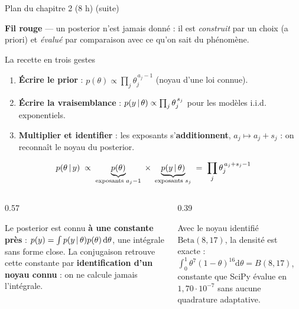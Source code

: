 \begin{frame}{Plan du chapitre 2 (8 h) (suite)}
\begin{tcolorbox}[colback=byPurple!6,colframe=byPurple,arc=2mm,width=.95\textwidth]
\small\centering
\textbf{Fil rouge} — un posterior n'est jamais donné : il est \emph{construit} par un choix
(a priori) et \emph{évalué} par comparaison avec ce qu'on sait du phénomène.
\end{tcolorbox}
\end{frame}

\begin{frame}{La recette en trois gestes}
\begin{ebox}
\begin{enumerate}
  \item \textbf{Écrire le prior} : $p(\theta) \propto \prod_j \theta_j^{\,a_j - 1}$
        (noyau d'une loi connue).
  \item \textbf{Écrire la vraisemblance} : $p(y \,\vert\, \theta) \propto
        \prod_j \theta_j^{\,s_j}$ pour les modèles i.i.d. exponentiels.
  \item \textbf{Multiplier et identifier} : les exposants s'\textbf{additionnent},
        $a_j \mapsto a_j + s_j$ : on reconnaît le noyau du posterior.
\end{enumerate}
\[
p(\theta \,\vert\, y) \;\propto\; \underbrace{p(\theta)}_{\text{exposants } a_j - 1}
\;\times\; \underbrace{p(y \,\vert\, \theta)}_{\text{exposants } s_j}
\;=\; \prod_j \theta_j^{\,a_j + s_j - 1}
\]
\end{ebox}
\vspace{1mm}
\begin{columns}[t]
\begin{column}{0.57\textwidth}
\begin{kbox}
Le posterior est connu \textbf{à une constante près} :
$p(y) = \int p(y \,\vert\, \theta) p(\theta)\,\mathrm{d}\theta$, une intégrale sans
forme close. La conjugaison retrouve cette constante par
\textbf{identification d'un noyau connu} : on ne calcule jamais l'intégrale.
\end{kbox}
\end{column}
\begin{column}{0.39\textwidth}
\begin{ebox}
Avec le noyau identifié $\mathrm{Beta}(8, 17)$, la densité est exacte :
$\int_0^1 \theta^{7}(1-\theta)^{16}\mathrm{d}\theta = B(8,17)$,
constante que SciPy évalue en $1{,}70 \cdot 10^{-7}$ sans aucune quadrature
adaptative.
\end{ebox}
\end{column}
\end{columns}
\end{frame}

